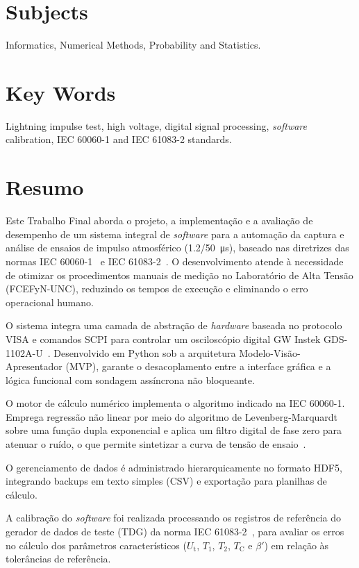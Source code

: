 \section*{Subjects}
Informatics, Numerical Methods, Probability and Statistics.

\section*{Key Words}
Lightning impulse test, high voltage, digital signal processing, \emph{software} calibration, IEC 60060-1 and IEC 61083-2 standards.

\newpage
\section*{Resumo}
Este Trabalho Final aborda o projeto, a implementação e a avaliação de desempenho de um sistema integral de \emph{software} para a automação da captura e análise de ensaios de impulso atmosférico (\qty[parse-numbers=false]{1.2/50}{\micro\second}), baseado nas diretrizes das normas IEC 60060-1~\cite{iec60060_1} e IEC 61083-2~\cite{iec61083_2}. O desenvolvimento atende à necessidade de otimizar os procedimentos manuais de medição no Laboratório de Alta Tensão (FCEFyN-UNC), reduzindo os tempos de execução e eliminando o erro operacional humano.

O sistema integra uma camada de abstração de \emph{hardware} baseada no protocolo VISA e comandos SCPI para controlar um osciloscópio digital GW Instek GDS-1102A-U~\cite{gds1000au_ProgrammingManual}. Desenvolvido em Python sob a arquitetura Modelo-Visão-Apresentador (MVP), garante o desacoplamento entre a interface gráfica e a lógica funcional com sondagem assíncrona não bloqueante.

O motor de cálculo numérico implementa o algoritmo indicado na IEC 60060-1. Emprega regressão não linear por meio do algoritmo de Levenberg-Marquardt sobre uma função dupla exponencial e aplica um filtro digital de fase zero para atenuar o ruído, o que permite sintetizar a curva de tensão de ensaio~\cite{iec60060_1}.

O gerenciamento de dados é administrado hierarquicamente no formato HDF5, integrando backups em texto simples (CSV) e exportação para planilhas de cálculo.

A calibração do \emph{software} foi realizada processando os registros de referência do gerador de dados de teste (TDG) da norma IEC 61083-2~\cite{iec61083_2}, para avaliar os erros no cálculo dos parâmetros característicos ($U_\text{t}$, $T_1$, $T_2$, $T_\text{C}$ e $\beta'$) em relação às tolerâncias de referência.

